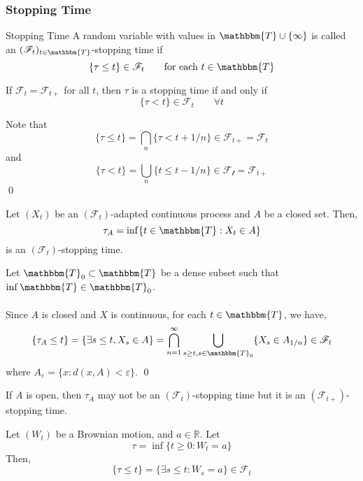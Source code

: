 \documentclass[12pt,a4paper]{article}
\newcommand{\R}{\mathbb{R}}
\renewenvironment{proof}
    {\begin{trivlist}\item[\hskip\labelsep\color{blue}\bfseries Proof:]}
    {\qed\end{trivlist}}
\begin{document}
\subsubsection{Stopping Time}
\begin{definition}{Stopping Time}{}
A random variable with values in $\mathbbm{T}\cup\{\infty\}$ is called an $(\mathscr{F}_t)_{t\in \mathbbm{T}}$-stopping time if 
$$
\{\tau\le t\}\in\mathscr{F}_t\qquad\text{for each $t\in \mathbbm{T}$}
$$
\end{definition}
\begin{proposition}{}{}
    If $\mathscr{F}_t = \mathscr{F}_{t+}$ for all $t$, then $\tau$ is a stopping time if and only if 
    $$
    \{\tau<t\}\in\mathscr{F}_t\qquad \forall t
    $$
\end{proposition}
\begin{proof}
    Note that 
    $$
    \{\tau\le t\} = \bigcap_{n}\{\tau<t+1/n\}\in\mathscr{F}_{t+}=\mathscr{F}_t
    $$
    and
    $$
    \{\tau<t\} = \bigcup_{n} \{t\le t-1/n\} \in \mathscr{F_t} = \mathscr{F}_{t+}
    $$
\end{proof}
\begin{proposition}{}{}
    Let $(X_t)$ be an $(\mathscr{F}_t)$-adapted continuous process and $A$ be a closed set. Then,
    $$
    \tau_A = \inf\{t\in\mathbbm{T}: X_t\in A\}
    $$
    is an $(\mathscr{F}_t)$-stopping time.
\end{proposition}
\begin{proof}
    Let $\mathbbm{T}_0\subset\mathbbm{T}$ be a dense subset such that $\inf \mathbbm{T}\in\mathbbm{T}_0$.\\
    \\
    Since $A$ is closed and $X$ is continuous, for each $t\in \mathbbm{T}$, we have,
    $$
    \{\tau_A\le t\} = \{\exists s\le t, X_s\in A\} = \bigcap_{n=1}^\infty \bigcup_{s\ge t, s\in\mathbbm{T}_0} \{X_s\in A_{1/n}\}\in \mathscr{F}_t
    $$
    where $A_\varepsilon = \{x: d(x,A)<\varepsilon\}$.
\end{proof}
\begin{remark}{}{}
    If $A$ is open, then $\tau_A$ may not be an $(\mathscr{F}_t)$-stopping time but it is an $(\mathscr{F}_{t+})$-stopping time. 
\end{remark}
\begin{example}{}{}
    Let $(W_t)$ be a Brownian motion, and $a\in\R$. Let
    $$
    \tau = \inf\{t\ge 0: W_t=a\}
    $$
    Then,
    $$
    \{\tau\le t\} = \{\exists s\le t: W_s=a\}\in\mathscr{F}_t
    $$
\end{example}
\end{document}
